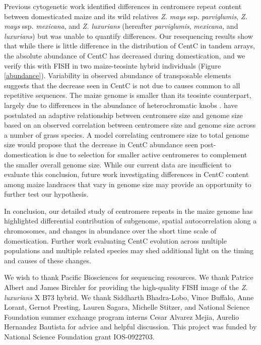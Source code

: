 Previous cytogenetic work  identified  differences in centromere repeat content  between domesticated maize and its wild relatives \emph{Z. mays} ssp. \emph{parviglumis}, \emph{Z. mays} ssp. \emph{mexicana}, and \emph{Z. luxurians} (hereafter \emph{parviglumis}, \emph{mexicana,} and \emph{luxurians}) \citep{Albert2010} but was unable to quantify  differences. 
Our resequencing results show that while there is little difference in the distribution of CentC in tandem arrays, the absolute abundance of CentC has  decreased during domestication, and we verify this with FISH in two maize-teosinte hybrid individuals (Figure \ref{abundance}). 
Variability in observed abundance of transposable elements \citep{Chia2012} suggests that the decrease seen in CentC is not due to causes common to all repetitive sequences.
The maize genome is smaller than its teosinte counterpart, largely due to differences in the abundance of heterochromatic knobs \citep{poggio1998}.  
\citet{Zhang2012} have postulated an adaptive relationship between centromere size and genome size based on an observed correlation between centromere size and genome size across a number of grass species.  
A model correlating centromere size to total genome size would propose that the decrease in CentC abundance seen post-domestication is due to selection for smaller active centromeres to complement the smaller overall genome size.
While our current data are insufficient to evaluate this conclusion, future work investigating differences in CentC content among maize landraces that vary in genome size \citep{poggio1998} may provide an opportunity to further test our hypothesis.  

In conclusion, our detailed study of centromere repeats in the maize genome has highlighted differential contribution of subgenome, spatial autocorrelation along a chromosomes, and changes in abundance over the short time scale of domestication.  
Further work evaluating CentC evolution across multiple populations and multiple related species may shed additional light on the timing and causes of these changes.  

\begin{acknowledgements}
We wish to thank Pacific Biosciences for sequencing resources.  We thank Patrice Albert and James Birchler for providing the high-quality FISH image of the \emph{Z. luxurians} X B73 hybrid.  We thank Siddharth Bhadra-Lobo, Vince Buffalo, Anne Lorant, Gernot Presting, Lauren Sagara, Michelle Stitzer, and National Science Foundation summer exchange program interns Cesar Alvarez Mejia, Aurelio Hernandez Bautista for advice and helpful discussion. This project was funded by National Science Foundation grant IOS-0922703.
\end{acknowledgements}

